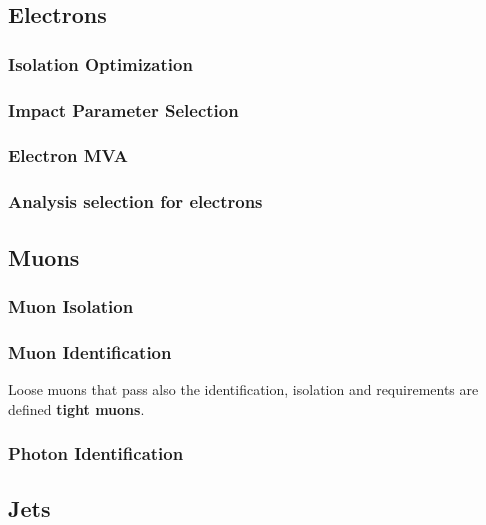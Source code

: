 \subsection{Electrons}
\subsubsection{Isolation Optimization}
\label{sec:eleiso}

\subsubsection{Impact Parameter Selection}
\label{sec:eleSIP}

\subsubsection{Electron MVA}
\label{sec:eleMVA}

\subsubsection{Analysis selection for electrons}%
\label{sec:ele_selection}


\subsection{Muons}
\subsubsection{Muon Isolation}
\label{sec:muoniso}

\subsubsection{Muon Identification}


Loose muons that pass also the identification, isolation and \SIPthreeD requirements are defined \textbf{tight muons}.

\subsubsection{Photon Identification}
\label{sec:photonID}


\subsection{Jets}

